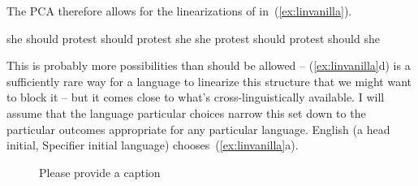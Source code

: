 \documentclass[output=paper]{langsci/langscibook}
\begin{document}
The \gls{PCA} therefore allows for the linearizations of  in~(\ref{ex:linvanilla}).
\begin{exe}
	\ex \label{ex:linvanilla}
	\begin{xlist}
		\ex she should protest
		\ex should protest she
		\ex she protest should
		\ex protest should she
	\end{xlist}
\end{exe}

This is probably more possibilities than should be allowed -- (\ref{ex:linvanilla}d) is a sufficiently rare way for a language to linearize this structure that we might want to block it -- but it comes close to what's cross-linguistically available. I will assume that the language particular choices narrow this set down to the particular outcomes appropriate for any particular language. English (a head initial, Specifier initial language) chooses~(\ref{ex:linvanilla}a).

\begin{figure}
\caption{\label{ex:multi3-2}\color{red}Please provide a caption}
\end{figure}
\end{document}
